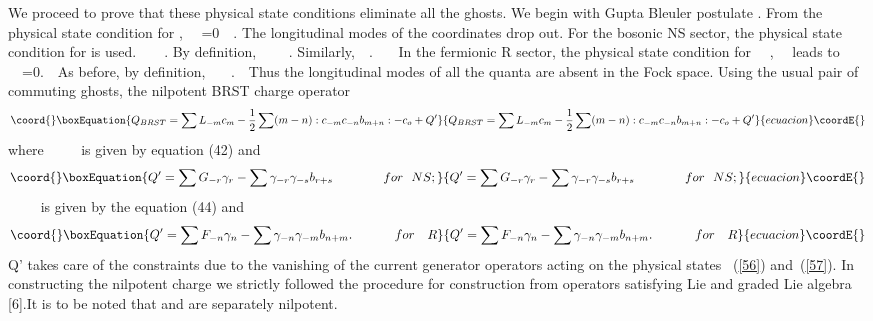 \documentclass[a4paper,showpacs,preprintnumbers,amsmath,amssymb]{revtex4}
\begin{document}
We proceed to prove that these physical state conditions eliminate all the ghosts. We
begin with Gupta Bleuler postulate  \coordHE{}. From the physical state
condition for \coordHE{}, ~~\coordHE{}=0~~. 
The longitudinal modes of the coordinates drop out. For the bosonic NS sector,
the physical state condition for \coordHE{} is used.~~\coordHE{}~~. By definition, ~~\coordHE{}~~.
Similarly,~~\coordHE{}.~~~ In the fermionic R sector, the physical state condition for ~~\coordHE{},~~ leads to
~~\coordHE{}=0.~~As before, by definition, 
~~~\coordHE{}.~~Thus the longitudinal modes of all the 
quanta are absent in the Fock space. Using the usual pair of \myHighlight{$(\beta,\gamma)$}\coordHE{} 
commuting ghosts, the nilpotent BRST charge operator
\begin{equation}\coord{}\boxEquation{
Q_{BRST}=\sum L_{-m}c_m -\frac{1}{2}\sum (m-n):c_{-m}c_{-n}b_{m+n}: - c_o + Q'
}{
Q_{BRST}=\sum L_{-m}c_m -\frac{1}{2}\sum (m-n):c_{-m}c_{-n}b_{m+n}: - c_o + Q'
}{ecuacion}\coordE{}\end{equation}
where ~~\coordHE{}~~ is given by equation (42) and
\begin{equation}\coord{}\boxEquation{
 Q'=\sum G_{-r}\gamma_r -\sum\gamma_{-r}\gamma_{-s}b_{r+s}~~~~~~~~~~~~for~~  NS;
}{
 Q'=\sum G_{-r}\gamma_r -\sum\gamma_{-r}\gamma_{-s}b_{r+s}~~~~~~~~~~~~for~~  NS;
}{ecuacion}\coordE{}\end{equation}
~~\coordHE{}~~ is given by the equation (44) and
\begin{equation}\coord{}\boxEquation{
 Q'=\sum F_{-n}\gamma_{n} -\sum\gamma_{-n}\gamma_{-m}b_{n+m}.~~~~~~~~~~ for~~~ R
}{
 Q'=\sum F_{-n}\gamma_{n} -\sum\gamma_{-n}\gamma_{-m}b_{n+m}.~~~~~~~~~~ for~~~ R
}{ecuacion}\coordE{}\end{equation}
Q' takes care of the constraints due to the vanishing of the current generator operators
acting on the physical states ~(\ref{56}) and~(\ref{57}). In constructing the nilpotent
charge we strictly followed the procedure for construction from operators satisfying
Lie and graded Lie algebra [6].It is to be noted that \coordHE{} and \coordHE{} are 
separately nilpotent. 
\end{document}
